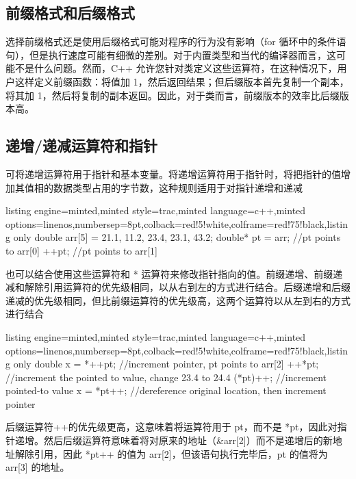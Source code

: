 \subsection{前缀格式和后缀格式}
选择前缀格式还是使用后缀格式可能对程序的行为没有影响（for 循环中的条件语句），但是执行速度可能有细微的差别。对于内置类型和当代的编译器而言，这可能不是什么问题。然而，C++ 允许您针对类定义这些运算符，在这种情况下，用户这样定义前缀函数：将值加 1，然后返回结果；但后缀版本首先复制一个副本，将其加 1，然后将复制的副本返回。因此，对于类而言，前缀版本的效率比后缀版本高。
\subsection{递增/递减运算符和指针}
可将递增运算符用于指针和基本变量。将递增运算符用于指针时，将把指针的值增加其值相的数据类型占用的字节数，这种规则适用于对指针递增和递减
\begin{tcblisting}{listing engine=minted,minted style=trac,minted language=c++,minted options={linenos,numbersep=8pt},colback=red!5!white,colframe=red!75!black,listing only}
	double arr[5] = {21.1, 11.2, 23.4, 23.1, 43.2};
	double* pt = arr;  //pt points to arr[0]
	++pt;             //pt points to arr[1]
\end{tcblisting}
也可以结合使用这些运算符和 * 运算符来修改指针指向的值。前缀递增、前缀递减和解除引用运算符的优先级相同，以从右到左的方式进行结合。后缀递增和后缀递减的优先级相同，但比前缀运算符的优先级高，这两个运算符以从左到右的方式进行结合
\begin{tcblisting}{listing engine=minted,minted style=trac,minted language=c++,minted options={linenos,numbersep=8pt},colback=red!5!white,colframe=red!75!black,listing only}
	double x = *++pt;  //increment pointer, pt points to arr[2]
	++*pt;      
//increment the pointed to value, change 23.4 to 24.4
	(*pt)++;   //increment pointed-to value
	x = *pt++;
//dereference original location, then increment pointer
\end{tcblisting}
后缀运算符++的优先级更高，这意味着将运算符用于 pt，而不是 *pt，因此对指针递增。然后后缀运算符意味着将对原来的地址（\&arr[2]）而不是递增后的新地址解除引用，因此 *pt++ 的值为 arr[2]，但该语句执行完毕后，pt 的值将为 arr[3] 的地址。

